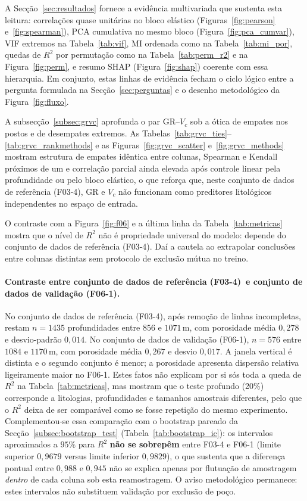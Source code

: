 \documentclass[12pt,a4paper]{article}
\newcommand{\dadosref}{conjunto de dados de referência (F03-4)}
\newcommand{\dadosval}{conjunto de dados de validação (F06-1)}
\begin{document}
A Secção~\ref{sec:resultados} fornece a evidência multivariada que sustenta
esta leitura: correlações quase unitárias no bloco elástico
(Figuras~\ref{fig:pearson} e~\ref{fig:spearman}), PCA cumulativa no mesmo bloco (Figura~\ref{fig:pca_cumvar}), VIF extremos na
Tabela~\ref{tab:vif}, MI ordenada como na Tabela~\ref{tab:mi_por}, quedas de \(R^2\)
por permutação como na Tabela~\ref{tab:perm_r2} e na Figura~\ref{fig:perm}, e
resumo SHAP (Figura~\ref{fig:shap}) coerente com essa hierarquia. Em conjunto, estas
linhas de evidência fecham o ciclo lógico entre a pergunta formulada na
Secção~\ref{sec:perguntas} e o desenho metodológico da Figura~\ref{fig:fluxo}.

A subsecção~\ref{subsec:grvc} aprofunda o par GR--\(V_c\) sob a ótica de empates
nos postos e de desempates extremos. As Tabelas~\ref{tab:grvc_ties}--\ref{tab:grvc_rankmethods}
e as Figuras~\ref{fig:grvc_scatter} e~\ref{fig:grvc_methods} mostram estrutura de
empates idêntica entre colunas, Spearman e Kendall próximos de um e correlação
parcial ainda elevada após controle linear pela profundidade ou pelo bloco elástico,
o que reforça que, neste \dadosref, GR e \(V_c\) não funcionam como preditores
litológicos independentes no espaço de entrada.

O contraste com a Figura~\ref{fig:f06} e a última linha da Tabela~\ref{tab:metricas}
mostra que o nível de \(R^2\) não é propriedade universal do modelo: depende
do \dadosref. Daí a cautela ao extrapolar conclusões entre colunas distintas sem
protocolo de exclusão mútua no treino.

\paragraph{Contraste entre \dadosref\ e \dadosval.}
No \dadosref, após remoção de linhas incompletas, restam
\(n=1435\) profundidades entre \(856\) e \(1071\,\mathrm{m}\), com porosidade média
\(0{,}278\) e desvio-padrão \(0{,}014\). No \dadosval, \(n=576\)
entre \(1084\) e \(1170\,\mathrm{m}\), com porosidade média \(0{,}267\) e desvio
\(0{,}017\). A janela vertical é distinta e o segundo conjunto é menor; a
porosidade apresenta dispersão relativa ligeiramente maior no F06-1. Estes fatos
não explicam por si sós toda a queda de \(R^2\) na Tabela~\ref{tab:metricas}, mas
mostram que o teste profundo (20\%) corresponde a litologias, profundidades e
tamanhos amostrais diferentes, pelo que o \(R^2\) deixa de ser comparável como se
fosse repetição do mesmo experimento. Complementou-se essa comparação com o
bootstrap pareado da Secção~\ref{subsec:bootstrap_test} (Tabela~\ref{tab:bootstrap_ic}):
os intervalos aproximados a \(95\%\) para \(R^2\) \textbf{não se sobrepêm} entre
F03-4 e F06-1 (limite superior \(0{,}9679\) versus limite inferior \(0{,}9829\)), o que
sustenta que a diferença pontual entre \(0{,}988\) e \(0{,}945\) não se explica
apenas por flutuação de amostragem \textit{dentro} de cada coluna sob esta
reamostragem. O aviso metodológico permanece: estes intervalos não substituem
validação por exclusão de poço.
\end{document}
